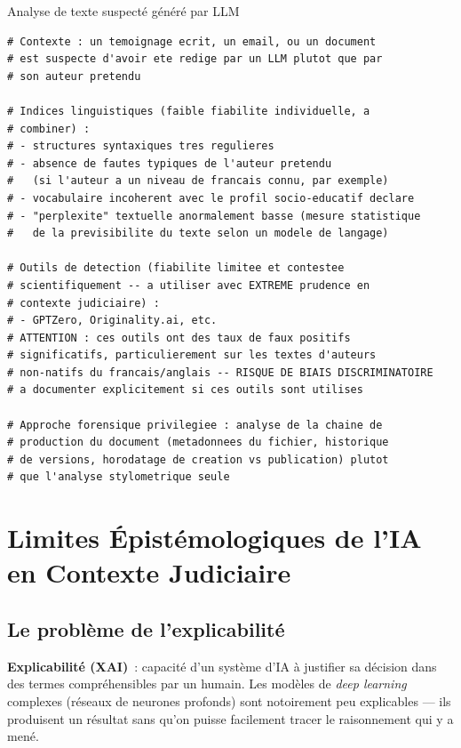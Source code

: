\begin{boxoutils}{Analyse de texte suspecté généré par LLM}
\begin{lstlisting}[language=bash_forensique]
# Contexte : un temoignage ecrit, un email, ou un document
# est suspecte d'avoir ete redige par un LLM plutot que par
# son auteur pretendu

# Indices linguistiques (faible fiabilite individuelle, a
# combiner) :
# - structures syntaxiques tres regulieres
# - absence de fautes typiques de l'auteur pretendu
#   (si l'auteur a un niveau de francais connu, par exemple)
# - vocabulaire incoherent avec le profil socio-educatif declare
# - "perplexite" textuelle anormalement basse (mesure statistique
#   de la previsibilite du texte selon un modele de langage)

# Outils de detection (fiabilite limitee et contestee
# scientifiquement -- a utiliser avec EXTREME prudence en
# contexte judiciaire) :
# - GPTZero, Originality.ai, etc.
# ATTENTION : ces outils ont des taux de faux positifs
# significatifs, particulierement sur les textes d'auteurs
# non-natifs du francais/anglais -- RISQUE DE BIAIS DISCRIMINATOIRE
# a documenter explicitement si ces outils sont utilises

# Approche forensique privilegiee : analyse de la chaine de
# production du document (metadonnees du fichier, historique
# de versions, horodatage de creation vs publication) plutot
# que l'analyse stylometrique seule
\end{lstlisting}
\end{boxoutils}

\section{Limites Épistémologiques de l'IA en Contexte Judiciaire}
\label{sec:limites-ia}

\subsection{Le problème de l'explicabilité}

\begin{boxdef}
\textbf{Explicabilité (XAI)}~: capacité d'un
système d'IA à justifier sa décision dans des termes compréhensibles
par un humain. Les modèles de \textit{deep learning} complexes
(réseaux de neurones profonds) sont notoirement peu explicables
--- ils produisent un résultat sans qu'on puisse facilement tracer
le raisonnement qui y a mené.
\end{boxdef}

